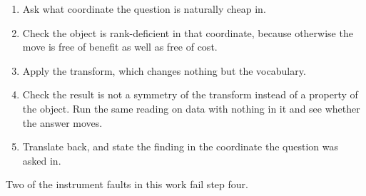 \begin{enumerate}
  \item Ask what coordinate the question is naturally cheap in.
  \item Check the object is rank-deficient in that coordinate, because otherwise the move is free of benefit as well as free of cost.
  \item Apply the transform, which changes nothing but the vocabulary.
  \item Check the result is not a symmetry of the transform instead of a property of the object. Run the same reading on data with nothing in it and see whether the answer moves.
  \item Translate back, and state the finding in the coordinate the question was asked in.
\end{enumerate}

Two of the instrument faults in this work fail step four.
